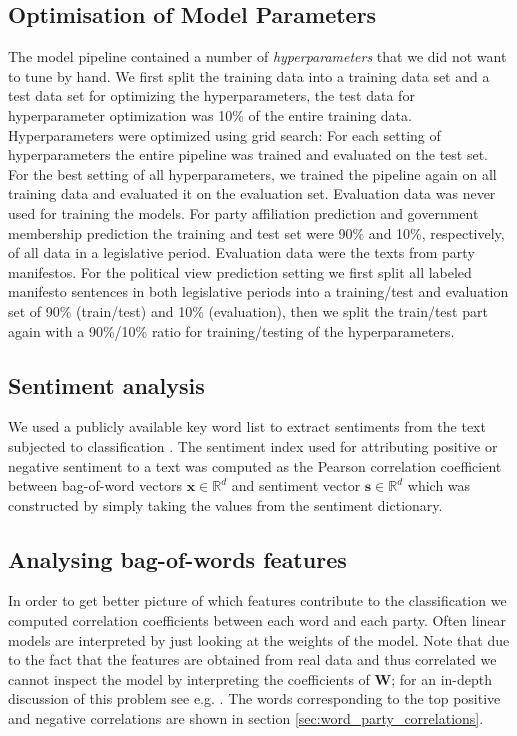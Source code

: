 \documentclass[runningheads,a4paper]{llncs}
\renewcommand{\vec}[1]{\mathbf{#1}}
\newcommand{\R}{\mathds{R}}
\begin{document}
\subsection{Optimisation of Model Parameters}\label{sec:crossvalidation}
The model pipeline contained a number of {\em hyperparameters} that we did not want to tune by hand. 
We first split the training data into a training data set and a test data set for optimizing the hyperparameters, the test data for hyperparameter optimization was 10\% of the entire training data. Hyperparameters were optimized using grid search: For each setting of hyperparameters the entire pipeline was trained and evaluated on the test set. For the best setting of all hyperparameters, we trained the pipeline again on all training data and evaluated it on the evaluation set. Evaluation data was never used for training the models. For party affiliation prediction and government membership prediction the training and test set were 90\% and 10\%, respectively, of all data in a legislative period. Evaluation data were the texts from party manifestos. For the political view prediction setting we first split all labeled manifesto sentences in both legislative periods into a training/test and evaluation set of 90\% (train/test) and 10\% (evaluation), then we split the train/test part again with a 90\%/10\% ratio for training/testing of the hyperparameters. 

\subsection{Sentiment analysis}\label{sec:sentiment_analysis_methods}
We used a publicly available key word list to extract sentiments from the text subjected to classification \cite{remquahey2010}. The sentiment index used for attributing positive or negative sentiment to a text was computed  as the Pearson correlation coefficient between bag-of-word vectors $\vec{x}\in\R^d$ and sentiment vector $\vec{s}\in\R^d$ which was constructed by simply taking the values from the sentiment dictionary. 

\subsection{Analysing bag-of-words features}
In order to get  better picture of which features contribute to the classification we computed correlation coefficients between each word and each party. Often linear models are interpreted by just looking at the weights of the model. Note that due to the fact that the features are obtained from real data and thus correlated we cannot inspect the model by interpreting the coefficients of $\vec{W}$; for an in-depth discussion of this problem see e.g. \cite{Haufe2013}. The words corresponding to the top positive and negative correlations are shown in section \autoref{sec:word_party_correlations}.
\end{document}
